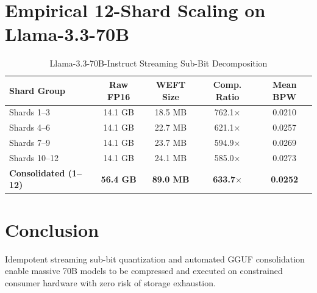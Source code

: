 \documentclass[10pt,journal,compsoc]{IEEEtran}
\begin{document}
\section{Empirical 12-Shard Scaling on Llama-3.3-70B}
\begin{table}[h]
\caption{Llama-3.3-70B-Instruct Streaming Sub-Bit Decomposition}
\centering
\begin{tabular}{lcccc}
\toprule
\textbf{Shard Group} & \textbf{Raw FP16} & \textbf{WEFT Size} & \textbf{Comp. Ratio} & \textbf{Mean BPW} \\
\midrule
Shards 1--3 & 14.1 GB & 18.5 MB & 762.1$\times$ & 0.0210 \\
Shards 4--6 & 14.1 GB & 22.7 MB & 621.1$\times$ & 0.0257 \\
Shards 7--9 & 14.1 GB & 23.7 MB & 594.9$\times$ & 0.0269 \\
Shards 10--12 & 14.1 GB & 24.1 MB & 585.0$\times$ & 0.0273 \\
\midrule
\textbf{Consolidated (1--12)} & \textbf{56.4 GB} & \textbf{89.0 MB} & \textbf{633.7$\times$} & \textbf{0.0252} \\
\bottomrule
\end{tabular}
\end{table}

\section{Conclusion}
Idempotent streaming sub-bit quantization and automated GGUF consolidation enable massive 70B models to be compressed and executed on constrained consumer hardware with zero risk of storage exhaustion.
\end{document}
